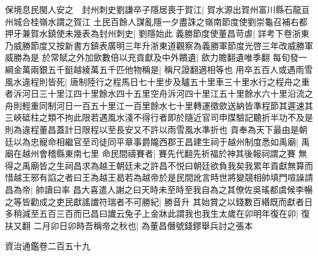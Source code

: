 保境息民閩人安之　封州刺史劉謙卒子隱居喪于賀江|{
	賀水源出賀州富川縣石龍亘州城合桂嶺水謂之賀江}
土民百餘人謀亂隱一夕盡誅之嶺南節度使劉崇龜召補右都押牙兼賀水鎮使未幾表為封州刺史|{
	劉隱始此}
義勝節度使董昌苛虐|{
	詳考下卷浙東乃威勝節度又按新書方鎮表廣明三年升浙東道觀察為義勝軍節度光啓三年改威勝軍威勝為是}
於常賦之外加歛數倍以充貢獻及中外饋遺|{
	歛力贍翻遺唯季翻}
每旬發一綱金萬兩銀五千鋌越綾萬五千匹他物稱是|{
	稱尺證翻適相等也}
用卒五百人或遇雨雪風水違程則皆死|{
	唐制陸行之程馬日七十里步及驢五十里車三十里水行之程舟之重者泝河日三十里江四十里餘水四十五里空舟泝河四十里江五十里餘水六十里沿流之舟則輕重同制河日一百五十里江一百里餘水七十里轉運徵歛送納皆準程節其遲速其三峽砥柱之類不拘此限若遇風水淺不得行者即於隨近官司申牒驗記聽折半功不及是則為違程董昌蓋計日限程以至長安又不許以雨雪風水準折也}
貢奉為天下最由是朝廷以為忠寵命相繼官至司徒同平章事爵隴西郡王昌建生祠于越州制度悉如禹廟|{
	禹廟在越州會稽縣東南七里}
命民間禱賽者|{
	賽先代翻先祈福於神其後報祠謂之賽}
無得之禹廟皆之生祠昌求為越王朝廷未之許昌不悦曰朝廷欲負我矣我累年貢獻無算而惜越王邪有諂之者曰王為越王曷若為越帝於是民間訛言時世將變競相帥填門喧譟請昌為帝|{
	帥讀曰率}
昌大喜遣人謝之曰天時未至時至我自為之其僚佐吳瑤都虞候李暢之等皆勸成之吏民獻謠䜟符瑞者不可勝紀|{
	勝音升}
其始賞之以錢數百緡既而獻者日多稍減至五百三百而已昌曰䜟云兔子上金牀此謂我也我生太歲在卯明年復在卯|{
	復扶又翻}
二月卯日卯時吾稱帝之秋也|{
	為董昌僭號錢鏐舉兵討之張本}


資治通鑑卷二百五十九
